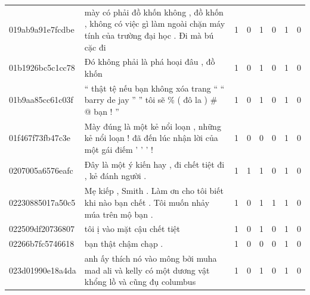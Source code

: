 \begin{table}[htb]
{\begin{minipage}{\textheight}
\begin{threeparttable}
\begin{tabularx}{\textwidth}{L{0.8} L{6.6} C{0.1} C{0.1} C{0.1} C{0.1} C{0.1} C{0.1}}
                    019ab9a91e7fcdbe & mày có phải đồ khốn không , đồ khốn , không có việc gì làm ngoài chặn máy tính của trường đại học . Đi mà bú cặc đi               & 1           & 0           & 1           & 0           & 1           & 0           \\
                    01b1926bc5c1cc78 & Đó không phải là phá hoại đâu , đồ khốn                                                                                           & 1           & 0           & 1           & 0           & 1           & 0           \\
                    01b9aa85cc61c03f & `` thật tệ nếu bạn không xóa trang `` `` barry de jay '' '' tôi sẽ \% ( đô la ) \# @ bạn ! ''                                     & 1           & 0           & 1           & 0           & 1           & 0           \\
                    01f467f73fb47c3e & Mày đúng là một kẻ nổi loạn , những kẻ nổi loạn ! đã đến lúc nhận lời của một gái điếm ' ' ' !                                    & 1           & 0           & 0           & 0           & 1           & 0           \\
                    0207005a6576eafc & Đây là một ý kiến hay , đi chết tiệt đi , kẻ đánh người .                                                                         & 1           & 1           & 1           & 0           & 1           & 0           \\
                    02230885017a50c5 & Mẹ kiếp , Smith . Làm ơn cho tôi biết khi nào bạn chết . Tôi muốn nhảy múa trên mộ bạn .                                          & 1           & 0           & 1           & 1           & 1           & 0           \\
                    022509df20736807 & tôi ị vào mặt cậu chết tiệt                                                                                                       & 1           & 0           & 1           & 0           & 1           & 0           \\
                    02266b7fc5746618 & bạn thật chậm chạp .                                                                                                              & 1           & 0           & 0           & 0           & 1           & 0           \\
                    023d01990e18a4da & anh ấy thích nó vào mông bởi muha mad ali và kelly có một dương vật khổng lồ và cũng đụ columbus                                  & 1           & 0           & 1           & 0           & 1           & 0           \\

\end{tabularx}
\end{threeparttable}
\end{minipage}}
\end{table}
